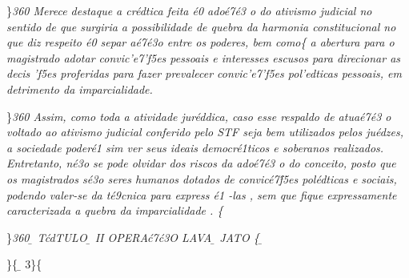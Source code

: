  \ltrch{} 
\par \}\pard \ltrpar\qj {}\sl360\widctlpar\wrapdefault\faauto{} {\rtlch{}  \ltrch{}   Merece destaque a cr\'edtica feita \'e0 ado\'e7\'e3
o do ativismo judicial no sentido de que surgiria a possibilidade de quebra da harmonia constitucional no que diz respeito }{\rtlch{}  \ltrch{}  \'e0}{\rtlch{}  \ltrch{}   separ}{
\rtlch{}  \ltrch{}  a\'e7\'e3o entre os poderes, bem como}\{\rtlch{}
 \ltrch{}  a abertura para o
magistrado adotar convic'e7'f5es pessoais e interesses escusos para
direcionar as decis 'f5es proferidas para fazer prevalecer
convic'e7'f5es pol'edticas pessoais, em detrimento da imparcialidade.\\
\par \}\pard \ltrpar\qj {}\sl360\widctlpar\wrapdefault\faauto{} {\rtlch{}  \ltrch{}  Assim, como toda a atividade jur\'eddica, caso esse respaldo de atua\'e7\'e3
o voltado ao ativismo judicial conferido pelo STF seja bem utilizados pelos ju\'edzes, a sociedade poder\'e1 sim ver seus ideais democr\'e1ticos e soberanos realizados. Entretanto, n\'e3o se pode olvidar dos riscos da ado\'e7\'e3
o do conceito, posto que os magistrados s\'e3o seres humanos dotados de convic\'e7\'f5es pol\'edticas e sociais, podendo valer-se da t\'e9cnica para express}{\rtlch{}  \ltrch{}  \'e1}{\rtlch{}  \ltrch{} 
 -las}{\rtlch{}  \ltrch{}  , sem que fique expressamente caracterizada a quebra da imparcialidade}{\rtlch{}  \ltrch{}  . }\{\rtlch{}
 \ltrch{} 
\par \}\pard \ltrpar\qj {}\sl360\widctlpar\wrapdefault\faauto{} {\rtlch{} \ab{} \ltrch{} \b{} T\'cdTULO}{\rtlch{} \ab{} \ltrch{} 
\b{}  II \endash  OPERA\'c7\'c3O LAVA}{\rtlch{} \ab{} \ltrch{} \b{} JATO }\{\rtlch{}
\ab{} \ltrch{} \b{}
\par \}\{\rtlch{} \ab{} \ltrch{}
\b{} 3\}\{\rtlch{} \ab{}

